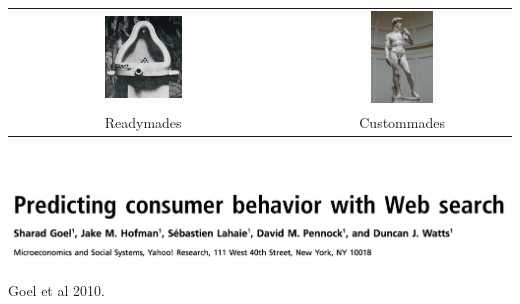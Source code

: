 \documentclass[aspectratio=169]{beamer}
\def\vf{\vfill}
\begin{document}
\begin{frame}

\begin{center}
\begin{tabular}{ccc}
\includegraphics[width=0.30\textwidth]{figures/duchamp_fountain} & \phantom{12345} & \includegraphics[width=0.30\textwidth]{figures/michelangelo_david} \\
\LARGE{Readymades} &  & \LARGE{Custommades}
\end{tabular}
\end{center}

\vf
\vspace{0.5in}
\\

\end{frame}
\begin{frame}

\begin{center}
\includegraphics[width=\textwidth]{figures/goel_predicting_2010_title}
\end{center}

Goel et al 2010.

\end{frame}
\end{document}
